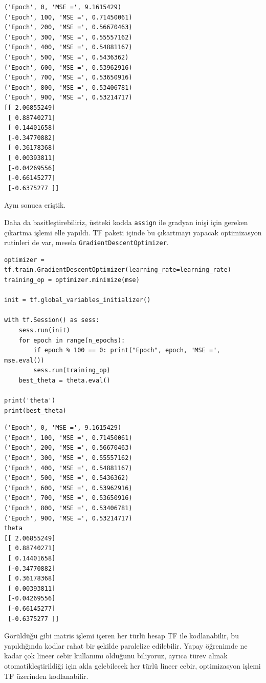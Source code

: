 \documentclass[12pt,fleqn]{article}\usepackage{../../common}
\begin{document}
\begin{verbatim}
('Epoch', 0, 'MSE =', 9.1615429)
('Epoch', 100, 'MSE =', 0.71450061)
('Epoch', 200, 'MSE =', 0.56670463)
('Epoch', 300, 'MSE =', 0.55557162)
('Epoch', 400, 'MSE =', 0.54881167)
('Epoch', 500, 'MSE =', 0.5436362)
('Epoch', 600, 'MSE =', 0.53962916)
('Epoch', 700, 'MSE =', 0.53650916)
('Epoch', 800, 'MSE =', 0.53406781)
('Epoch', 900, 'MSE =', 0.53214717)
[[ 2.06855249]
 [ 0.88740271]
 [ 0.14401658]
 [-0.34770882]
 [ 0.36178368]
 [ 0.00393811]
 [-0.04269556]
 [-0.66145277]
 [-0.6375277 ]]
\end{verbatim}

Aynı sonuca eriştik. 

Daha da basitleştirebiliriz, üstteki kodda \verb!assign! ile gradyan inişi
için gereken çıkartma işlemi elle yapıldı. TF paketi içinde bu çıkartmayı
yapacak optimizasyon rutinleri de var, mesela
\verb!GradientDescentOptimizer!.

\begin{verbatim}
optimizer = tf.train.GradientDescentOptimizer(learning_rate=learning_rate)
training_op = optimizer.minimize(mse)

init = tf.global_variables_initializer()

with tf.Session() as sess:
    sess.run(init)
    for epoch in range(n_epochs):
        if epoch % 100 == 0: print("Epoch", epoch, "MSE =", mse.eval())
        sess.run(training_op)    
    best_theta = theta.eval()

print('theta')
print(best_theta)
\end{verbatim}

\begin{verbatim}
('Epoch', 0, 'MSE =', 9.1615429)
('Epoch', 100, 'MSE =', 0.71450061)
('Epoch', 200, 'MSE =', 0.56670463)
('Epoch', 300, 'MSE =', 0.55557162)
('Epoch', 400, 'MSE =', 0.54881167)
('Epoch', 500, 'MSE =', 0.5436362)
('Epoch', 600, 'MSE =', 0.53962916)
('Epoch', 700, 'MSE =', 0.53650916)
('Epoch', 800, 'MSE =', 0.53406781)
('Epoch', 900, 'MSE =', 0.53214717)
theta
[[ 2.06855249]
 [ 0.88740271]
 [ 0.14401658]
 [-0.34770882]
 [ 0.36178368]
 [ 0.00393811]
 [-0.04269556]
 [-0.66145277]
 [-0.6375277 ]]
\end{verbatim}

Görüldüğü gibi matris işlemi içeren her türlü hesap TF ile kodlanabilir, bu
yapıldığında kodlar rahat bir şekilde paralelize edilebilir. Yapay
öğrenimde ne kadar çok lineer cebir kullanımı olduğunu biliyoruz, ayrıca
türev almak otomatikleştirildiği için akla gelebilecek her türlü lineer
cebir, optimizasyon işlemi TF üzerinden kodlanabilir.
\end{document}

